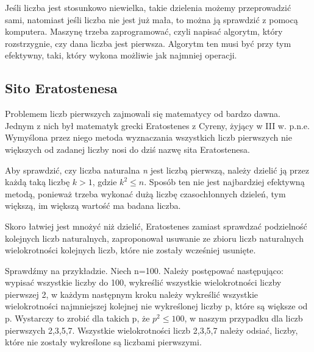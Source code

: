 \documentclass{article}
\begin{document}
Jeśli liczba jest stosunkowo niewielka, takie dzielenia możemy przeprowadzić sami, natomiast jeśli liczba nie jest już mała, to można ją sprawdzić z pomocą komputera. Maszynę trzeba zaprogramować, czyli napisać algorytm, który rozstrzygnie, czy dana liczba jest pierwsza. Algorytm ten musi być przy tym efektywny, taki, który wykona możliwie jak najmniej operacji.

\subsection{Sito Eratostenesa}

Problemem liczb pierwszych zajmowali się matematycy od bardzo dawna. Jednym z nich był matematyk grecki Eratostenes z Cyreny, żyjący w III w. p.n.e. Wymyślona przez niego metoda wyznaczania wszystkich liczb pierwszych nie większych od zadanej liczby nosi do dziś nazwę sita Eratostenesa.

Aby sprawdzić, czy liczba naturalna \textit{n} jest liczbą pierwszą, należy dzielić ją przez każdą taką liczbę \(k>1 \), gdzie \(k^{2}\leq n\). Sposób ten nie jest najbardziej efektywną metodą, ponieważ trzeba wykonać dużą liczbę czasochłonnych dzieleń, tym większą, im większą wartość ma badana liczba.

Skoro łatwiej jest mnożyć niż dzielić, Eratostenes zamiast sprawdzać podzielność kolejnych liczb naturalnych, zaproponował usuwanie ze zbioru liczb naturalnych wielokrotności kolejnych liczb, które nie zostały wcześniej usunięte.

Sprawdźmy na przykładzie. Niech n=100.
Należy postępować następująco: wypisać wszystkie liczby do 100, wykreślić wszystkie wielokrotności liczby pierwszej 2, w każdym następnym kroku należy wykreślić wszystkie wielokrotności najmniejszej kolejnej nie wykreślonej liczby p, które są większe od p. Wystarczy to zrobić dla takich p, że \(p^{2}\leq 100\), w naszym przypadku dla liczb pierwszych 2,3,5,7. Wszystkie wielokrotności liczb 2,3,5,7 należy odsiać, liczby, które nie zostały wykreślone są liczbami pierwszymi.\cite{math}
\end{document}

